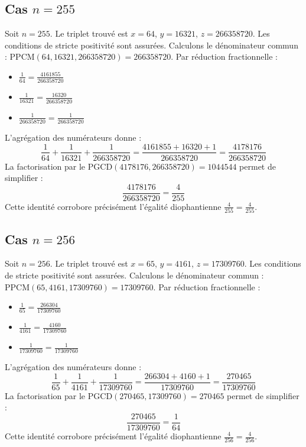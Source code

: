 \documentclass[11pt,a4paper]{article}
\begin{document}
\subsection{Cas $n = 255$}
Soit $n = 255$. Le triplet trouvé est $x = 64$, $y = 16321$, $z = 266358720$.
Les conditions de stricte positivité sont assurées.
Calculons le dénominateur commun : $\text{PPCM}(64, 16321, 266358720) = 266358720$.
Par réduction fractionnelle :
\begin{itemize}
    \item $\frac{1}{64} = \frac{4161855}{266358720}$
    \item $\frac{1}{16321} = \frac{16320}{266358720}$
    \item $\frac{1}{266358720} = \frac{1}{266358720}$
\end{itemize}
L'agrégation des numérateurs donne :
$$ \frac{1}{64} + \frac{1}{16321} + \frac{1}{266358720} = \frac{4161855 + 16320 + 1}{266358720} = \frac{4178176}{266358720} $$
La factorisation par le $\text{PGCD}(4178176, 266358720) = 1044544$ permet de simplifier :
$$ \frac{4178176}{266358720} = \frac{4}{255} $$
Cette identité corrobore précisément l'égalité diophantienne $\frac{4}{255} = \frac{4}{255}$.

\subsection{Cas $n = 256$}
Soit $n = 256$. Le triplet trouvé est $x = 65$, $y = 4161$, $z = 17309760$.
Les conditions de stricte positivité sont assurées.
Calculons le dénominateur commun : $\text{PPCM}(65, 4161, 17309760) = 17309760$.
Par réduction fractionnelle :
\begin{itemize}
    \item $\frac{1}{65} = \frac{266304}{17309760}$
    \item $\frac{1}{4161} = \frac{4160}{17309760}$
    \item $\frac{1}{17309760} = \frac{1}{17309760}$
\end{itemize}
L'agrégation des numérateurs donne :
$$ \frac{1}{65} + \frac{1}{4161} + \frac{1}{17309760} = \frac{266304 + 4160 + 1}{17309760} = \frac{270465}{17309760} $$
La factorisation par le $\text{PGCD}(270465, 17309760) = 270465$ permet de simplifier :
$$ \frac{270465}{17309760} = \frac{1}{64} $$
Cette identité corrobore précisément l'égalité diophantienne $\frac{4}{256} = \frac{4}{256}$.
\end{document}
